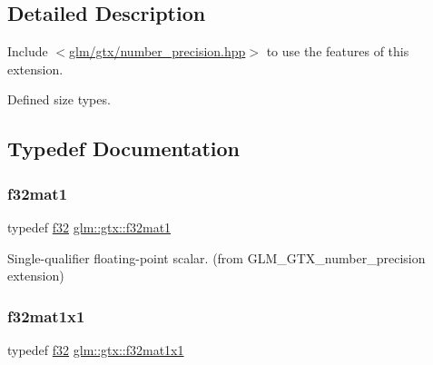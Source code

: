 \subsection{Detailed Description}
Include $<$\hyperlink{number__precision_8hpp}{glm/gtx/number\+\_\+precision.\+hpp}$>$ to use the features of this extension.

Defined size types. 

\subsection{Typedef Documentation}
\mbox{\label{group__gtx__number__precision_gae5ff376ec910c360f06acc0c2b99260c}} 
\subsubsection{\texorpdfstring{f32mat1}{f32mat1}}
{\footnotesize\ttfamily typedef \hyperlink{group__gtc__type__precision_ga0ec999b57f5330d9021256e96038df04}{f32} \hyperlink{group__gtx__number__precision_gae5ff376ec910c360f06acc0c2b99260c}{glm\+::gtx\+::f32mat1}}



Single-\/qualifier floating-\/point scalar. (from G\+L\+M\+\_\+\+G\+T\+X\+\_\+number\+\_\+precision extension) 

\mbox{\label{group__gtx__number__precision_ga01caec78388a82a9a22bd45e5751a38a}} 
\subsubsection{\texorpdfstring{f32mat1x1}{f32mat1x1}}
{\footnotesize\ttfamily typedef \hyperlink{group__gtc__type__precision_ga0ec999b57f5330d9021256e96038df04}{f32} \hyperlink{group__gtx__number__precision_ga01caec78388a82a9a22bd45e5751a38a}{glm\+::gtx\+::f32mat1x1}}



